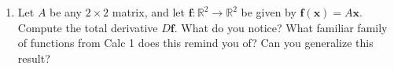 {\begin{enumerate}[resume]
	Try to answer without writing anything down.  Why did you make the choice you did?
	
	\begin{enumerate}
		\item $f(x,y)=y^2x^4e^x+2$
		
		\item $f(x,y)=y^2+y(\sin(x)-x^4)$
		
		\item $f(x,y)=x^2+5xy+\sin(x)+7e^x$
		
		\item $f(x,y)=xe^{y^/2}$
	\end{enumerate}
    \item Let $A$ be any $2\times 2$ matrix, and let $\mathbf{f}: \mathbb{R}^2\to\mathbb{R}^2$ be given by $\mathbf{f}(\mathbf{x}) = A\mathbf{x}$. Compute the total derivative $D\mathbf{f}$. What do you notice? What familiar family of functions from Calc 1 does this remind you of? Can you generalize this result? 
\end{enumerate}
}{}

